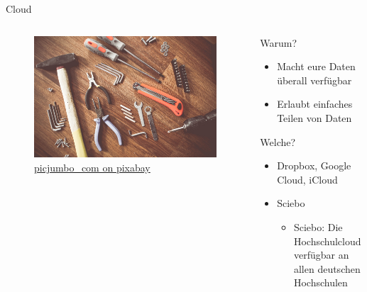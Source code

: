 \begin{frame}[t]{Cloud}
    \begin{columns}[t]   
        \begin{column}{0.29\textwidth}      
            \vspace{-3em}      
            \begin{figure}[t]
                \begin{flushleft}
                    \includegraphics[height=0.8\textheight,trim={0 0 25cm 0},clip]{graphics/tools-864983_1280.jpg}         
                    \caption*{\href{https://pixabay.com/de/photos/werkzeuge-konstruieren-boot-864983/}{picjumbo\_com on pixabay}}    
                \end{flushleft}                
            \end{figure}
        \end{column} 
        \begin{column}{0.7\textwidth}
            Warum?
            \begin{itemize}[]
                \item Macht eure Daten überall verfügbar
                \item Erlaubt einfaches Teilen von Daten
            \end{itemize}
            Welche?
            \begin{itemize}[]
                \item Dropbox, Google Cloud, iCloud
                \item Sciebo
                \begin{itemize}
                    \item Sciebo: Die Hochschulcloud verfügbar an allen deutschen Hochschulen

\end{itemize}
\end{itemize}
\end{column}
\end{columns}
\end{frame}

